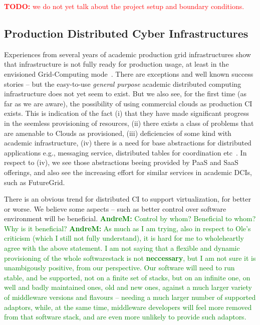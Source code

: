 \documentclass[]{article}
\newcommand{\I}[1]{\textit{#1}}
\newcommand{\B}[1]{\textbf{#1}}
\newcommand{\todo}[1]{{\textcolor{red}{\B{TODO:} #1 }}}
\newcommand{\amnote}[1]{{\textcolor{green}{   \B{AndreM:  } #1 }}}
\newcommand{\todo}[1]{}
\newcommand{\amnote}[1]{}
\begin{document}
\todo{we do not yet talk about the project setup and boundary
  conditions.}


 \subsection{Production Distributed Cyber Infrastructures}
 \label{ssec:state:dci}
  
  Experiences from several years of academic production grid
  infrastructures show that infrastructure is not fully ready for
  production usage, at least in the envisioned Grid-Computing
  mode~\cite{xsede_req,dpa-pdci-tr}.  There are exceptions and well
  known success stories -- but the easy-to-use \I{general purpose}
  academic distributed computing infrastructure does not yet seem to
  exist.  But we also see, for the first time (as far as we are
  aware), the possibility of using commercial clouds as production CI
  exists. This is indication of the fact (i) that they have made
  significant progress in the seemless provisioning of resources, (ii)
  there exists a class of problems that are amenable to Clouds as
  provisioned, (iii) deficiencies of some kind with academic
  infrastructure, (iv) there is a need for base abstractions for
  distributed applications e.g., messaging service, distributed tables
  for coordination etc~\cite{1542058}.  In respect to (iv), we see
  those abstractions beeing provided by PaaS and SaaS offerings, and
  also see the increasing effort for similar services in academic
  DCIs, such as FutureGrid.

  There is an obvious trend for distributed CI to support
  virtualization, for better or worse. We believe some aspects -- such
  as better control over software environment will be beneficial. 
  \amnote{Control by whom? Beneficial to whom? Why is it beneficial?}
  \amnote{As much as I am trying, also in respect to Ole's criticism
  (which I still not fully understand), it is hard for me to
  wholeheartly agree with the above statement.  I am not saying that a
  flexible and dynamic provisioning of the whole softwarestack is not
  \B{neccessary}, but I am not sure it is unambigously positive, from
  our perspective.  Our software will need to run stable, and be
  supported, not on a finite set of stacks, but on an infinite one, on
  well and badly maintained ones, old and new ones, against a much
  larger variety of middleware versions and flavours -- needing a much
  larger number of supported adaptors, while, at the same time,
  middleware developers will feel more removed from that software
  stack, and are even more unlikely to provide such adaptors.}
   
\end{document}
